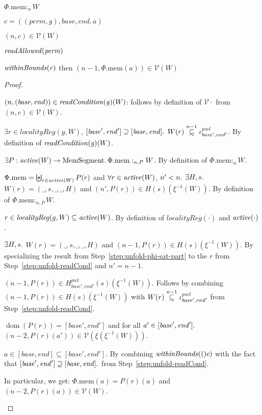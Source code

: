 \documentclass[a4paper]{article}
\newcommand\subsetsim{\mathrel{\ooalign{\raise.2ex\hbox{$\subset$}\cr
      \hidewidth\lower.8ex\hbox{\scalebox{0.9}{$\sim$}}\hidewidth\cr}}}
\newcommand{\nsubsim}[1][n]{\stackrel{\tiny{#1}}{\subsetsim}}
\DeclareMathOperator{\dom}{dom}
\newcommand{\var}[1]{\mathit{#1}}
\newcommand{\gl}{\var{g}}
\newcommand{\addr}{\var{a}}
\newcommand{\start}{\var{base}}
\newcommand{\addrend}{\var{end}}
\newcommand{\heap}{\var{mem}}
\newcommand{\perm}{\var{perm}}
\newcommand{\pwl}{\var{pwl}}
\newcommand{\plainproj}[1]{\mathrm{#1}}
\newcommand{\memheap}[1][\Phi]{#1.\plainproj{mem}}
\newcommand{\plainfun}[2]{
  \ifthenelse{\equal{#2}{}}
  {\mathit{#1}}
  {\mathit{#1}(#2)}
}
\newcommand{\readAllowed}[1]{\plainfun{readAllowed}{#1}}
\newcommand{\withinBounds}[1]{\plainfun{withinBounds}{#1}}
\newcommand{\readCond}[1]{\plainfun{readCondition}{#1}}
\newcommand{\activeReg}[1]{\plainfun{active}{#1}}
\newcommand{\heapSat}[3][\heap]{#1 :_{#2} #3}
\newcommand{\memSatPar}[4][n]{\heapSat[#2]{#1 , #4}{#3}}
\newcommand{\asmType}{\plaindom{AsmType}}
\newcommand{\plaindom}[1]{\mathrm{#1}}
\newcommand{\HeapSegments}{\plaindom{MemSegment}}
\newcommand{\intr}[2]{\mathcal{#1}}
\newcommand{\valueintr}[1]{\intr{V}{#1}}
\newcommand{\stdvr}{\valueintr{\asmType}}
\newcommand{\npair}[2][n]{\left(#1,#2 \right)}
\begin{document}
\begin{lemma}
  \label{lem:conds-load-suffice}
  \item $\heapSat[\memheap]{n}{W}$
  \item $\var{c} = ((\perm,\gl),\start,\addrend,\addr)$
  \item $\npair{c}\in\stdvr(W)$
  \item $\readAllowed{\perm}$ 
  \item $\withinBounds{\var{c}}$
  then $\npair[n-1]{\memheap(\addr)} \in \stdvr(W)$
\end{lemma}
\begin{proof}
  \begin{enumproof}
  \item $\npair{(\start,\addrend)} \in \readCond{\gl}(W)$: follows by
    definition of $\stdvr{\cdot}$ from $\npair{c}\in\stdvr(W)$.
  \item $\exists r \in \var{localityReg}(g,W)$, $[\start',\addrend'] \supseteq
    [\start,\addrend] \ldotp$ $W(r)\nsubsim[n-1]
    \iota_{\start',\addrend'}^\pwl$. By definition of $\readCond{\gl}(W)$. \label{step:unfold-readCond}
  \item $\exists P : \activeReg{W} \rightarrow \HeapSegments \ldotp
    \memSatPar{\memheap}{W}{P}$. By definition of $\heapSat[\memheap]{n}{W}$.
  \item $\memheap = \biguplus_{r\in\activeReg{W}}P(r)$ and $\forall r \in
    \activeReg{W}$, $n'<n \ldotp$ $\exists H,s \ldotp$ $W(r) = (\_,s,\_,\_,H)$
    and $\npair[n']{P(r)} \in H(s)(\xi^{-1}(W))$. By definition of
    $\memSatPar{\memheap}{W}{P}$. \label{step:unfold-phi-sat-part}
  \item $r \in \var{localityReg}(g,W)\subseteq \activeReg{W}$. By definition of
    $\var{localityReg}(\cdot)$ and $\activeReg{\cdot}$.
  \item $\exists H,s \ldotp$ $W(r) = (\_,s,\_,\_,H)$
    and $\npair[n-1]{P(r)} \in H(s)(\xi^{-1}(W))$.
    By specializing the result from
    Step~\ref{step:unfold-phi-sat-part} to the $r$ from
    Step~\ref{step:unfold-readCond} and $n' = n-1$.
  \item $\npair[n-1]{P(r)} \in H^\pwl_{\start',\addrend'}(s)(\xi^{-1}(W))$.
    Follows by combining $\npair[n-1]{P(r)} \in H(s)(\xi^{-1}(W))$ with
    $W(r)\nsubsim[n-1] \iota_{\start',\addrend'}^\pwl$ from Step~\ref{step:unfold-readCond}.
  \item $\dom(P(r)) = [\start',\addrend']$ and for all $\addr' \in
    [\start',\addrend']\ldotp$
    $\npair[n-2]{P(r)(\addr')}\in\stdvr(\xi(\xi^{-1}(W)))$.
  \item $\addr \in [\start,\addrend]\subseteq[\start',\addrend']$. By combining
    $\withinBounds(c)$ with the fact that $[\start',\addrend'] \supseteq
    [\start,\addrend] \ldotp$ from Step~\ref{step:unfold-readCond}.
  \item In particular, we get: $\memheap(\addr) = P(r)(\addr)$ and
    $\npair[n-2]{P(r)(\addr)}\in\stdvr(W)$.
  \end{enumproof}
\end{proof}
\end{document}
